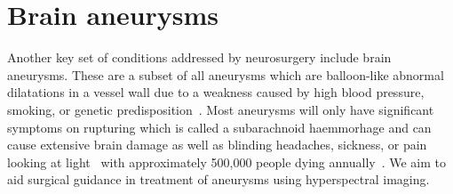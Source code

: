 \section{Brain aneurysms}\label{sec:aneurysms}
Another key set of conditions addressed by neurosurgery include brain aneurysms. These are a subset of all aneurysms which are balloon-like abnormal dilatations in a vessel wall due to a weakness caused by high blood pressure, smoking, or genetic predisposition~\cite{NationalHealthService2022}. Most aneurysms will only have significant symptoms on rupturing which is called a subarachnoid haemmorhage and can cause extensive brain damage as well as blinding headaches, sickness, or pain looking at light~\cite{NationalHealthService2022} with approximately 500,000 people dying annually~\cite{Toth2018}. We aim to aid surgical guidance in treatment of aneurysms using hyperspectral imaging. 

